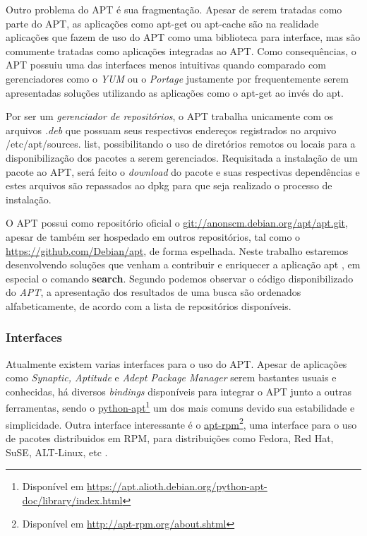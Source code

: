 Outro problema do {\code APT} é sua fragmentação. Apesar de serem tratadas como parte do APT, as aplicações como {\code apt-get} ou {\code apt-cache} são na realidade aplicações que fazem de uso do {\code APT} como uma biblioteca para interface, mas são comumente tratadas como aplicações integradas ao APT. Como consequências, o {\code APT} possuiu uma das interfaces menos intuitivas quando comparado com gerenciadores como o \textit{YUM} ou o \textit{Portage} justamente por frequentemente serem apresentadas soluções utilizando as aplicações como o {\code apt-get} ao invés do {\code apt}.

Por ser um \textit{gerenciador de repositórios}, o {\code APT} trabalha unicamente com os arquivos \textit{.deb} que possuam seus respectivos endereços registrados no arquivo {\code/etc/apt/sources. list}, possibilitando o uso de diretórios remotos ou locais para a disponibilização dos pacotes a serem gerenciados. Requisitada a instalação de um pacote ao {\code APT}, será feito o \textit{download} do pacote e  suas respectivas dependências e estes arquivos são repassados ao {\code dpkg} para que seja realizado o processo de instalação.

O {\code APT} possui como repositório oficial o \url{git://anonscm.debian.org/apt/apt.git}, apesar de também ser hospedado em outros repositórios, tal como o \url{https://github.com/Debian/apt}, de forma espelhada. Neste trabalho estaremos desenvolvendo soluções que venham a contribuir e enriquecer a aplicação 
{\code apt}
, em especial o comando \textbf{search}. Segundo podemos observar o código disponibilizado do \textit{APT}, a apresentação dos resultados de uma busca são ordenados alfabeticamente, de acordo com a lista de repositórios disponíveis.


\subsubsection*{Interfaces} %
\label{ssub:interfaces}
Atualmente existem varias interfaces para o uso do APT. Apesar de aplicações como \textit{Synaptic, Aptitude} e \textit{Adept Package Manager} serem bastantes usuais e conhecidas, há diversos \textit{bindings} disponíveis para integrar o {\code APT} junto a outras ferramentas, sendo o \href{https://apt.alioth.debian.org/python-apt-doc/library/index.html}{python-apt}\footnote{Disponível em \url{https://apt.alioth.debian.org/python-apt-doc/library/index.html}} um dos mais comuns  devido sua estabilidade e simplicidade. Outra interface interessante é o \href{http://apt-rpm.org/about.shtml}{apt-rpm}\footnote{Disponível em \url{http://apt-rpm.org/about.shtml}}, uma interface para o uso de pacotes distribuidos em RPM, para distribuições como Fedora, Red Hat, SuSE, ALT-Linux, etc \cite{apt-rpm}.

